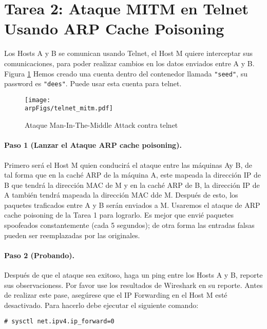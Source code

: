\section{Tarea 2: Ataque MITM en Telnet Usando ARP Cache Poisoning}

Los Hosts A y B se comunican usando Telnet, el Host M quiere interceptar sus comunicaciones, para poder realizar cambios en los datos enviados entre A y B. Figura \ref{arp:fig:telnet_mitm}
Hemos creado una cuenta dentro del contenedor llamada \texttt{"seed"}, su password es \texttt{"dees"}. Puede usar esta cuenta para telnet.


\begin{figure}
    \centering
    \texttt{[image: \\arpFigs/telnet\_mitm.pdf]}
    \caption{Ataque Man-In-The-Middle Attack contra telnet}
    \label{arp:fig:telnet_mitm}
\end{figure}


\paragraph{Paso 1 (Lanzar el Ataque ARP cache poisoning).} Primero será el Host M quien conducirá el ataque entre las máquinas Ay B, de tal forma que en la caché ARP de la máquina A, este mapeada la dirección IP de B que tendrá la dirección MAC de M y en la caché ARP de B, la dirección IP de A también tendrá mapeada la dirección MAC dde M. Después de esto, los paquetes traficados entre A y B serán enviados a M. Usaremos el ataque de ARP cache poisoning de la Tarea 1 para lograrlo. Es mejor que envié paquetes spoofeados constantemente (cada 5 segundos); de otra forma las entradas falsas pueden ser reemplazadas por las originales.


\paragraph{Paso 2 (Probando).} Después de que el ataque sea exitoso, haga un ping entre los Hosts A y B, reporte sus observacioness. Por favor use los resultados de Wireshark en su reporte. Antes de realizar este pase, asegúrese que el IP Forwarding en el Host M esté desactivado. Para hacerlo debe ejecutar el siguiente comando:

\begin{lstlisting}
# sysctl net.ipv4.ip_forward=0
\end{lstlisting}

